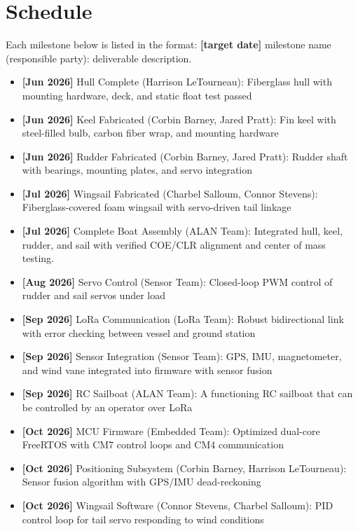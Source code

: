 
\section{Schedule}
\label{sec:schedule}

Each milestone below is listed in the format: \textbf{[target date]} milestone name (responsible party): deliverable description.

\begin{itemize}
    \item \textbf{[Jun 2026]} Hull Complete (Harrison LeTourneau): Fiberglass hull with mounting hardware, deck, and static float test passed
    \item \textbf{[Jun 2026]} Keel Fabricated (Corbin Barney, Jared Pratt): Fin keel with steel-filled bulb, carbon fiber wrap, and mounting hardware
    \item \textbf{[Jun 2026]} Rudder Fabricated (Corbin Barney, Jared Pratt): Rudder shaft with bearings, mounting plates, and servo integration
    \item \textbf{[Jul 2026]} Wingsail Fabricated (Charbel Salloum, Connor Stevens): Fiberglass-covered foam wingsail with servo-driven tail linkage
    \item \textbf{[Jul 2026]} Complete Boat Assembly (ALAN Team): Integrated hull, keel, rudder, and sail with verified COE/CLR alignment and center of mass testing.
    \item \textbf{[Aug 2026]} Servo Control (Sensor Team): Closed-loop PWM control of rudder and sail servos under load
    \item \textbf{[Sep 2026]} LoRa Communication (LoRa Team): Robust bidirectional link with error checking between vessel and ground station
    \item \textbf{[Sep 2026]} Sensor Integration (Sensor Team): GPS, IMU, magnetometer, and wind vane integrated into firmware with sensor fusion
    \item \textbf{[Sep 2026]} RC Sailboat (ALAN Team): A functioning RC sailboat that can be controlled by an operator over LoRa
    \item \textbf{[Oct 2026]} MCU Firmware (Embedded Team): Optimized dual-core FreeRTOS with CM7 control loops and CM4 communication
    \item \textbf{[Oct 2026]} Positioning Subsystem (Corbin Barney, Harrison LeTourneau): Sensor fusion algorithm with GPS/IMU dead-reckoning
    \item \textbf{[Oct 2026]} Wingsail Software (Connor Stevens, Charbel Salloum): PID control loop for tail servo responding to wind conditions

\end{itemize}
